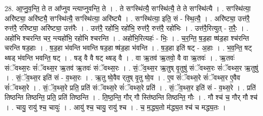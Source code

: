 \documentclass[17pt]{extarticle}
\begin{document}
28. आ॒प्नु॒व॒न्ति॒ ते त आ᳚प्नुव न्त्याप्नुवन्ति॒ ते । . ते सꣳस्थि॑त्यै॒ सꣳस्थि॑त्यै॒ ते ते सꣳस्थि॑त्यै । . सꣳस्थि॑त्या॒ अरि॑ष्ट्या॒ अरि॑ष्ट्यै॒ सꣳस्थि॑त्यै॒ सꣳस्थि॑त्या॒ अरि॑ष्ट्यै । . सꣳस्थि॑त्या॒ इति॒ सं - स्थि॒त्यै॒ । . अरि॑ष्ट्या॒ उत्त॑रै॒ रुत्त॑रै॒ ररि॑ष्ट्या॒ अरि॑ष्ट्या॒ उत्त॑रैः । . उत्त॑रै॒ रहो॑भि॒ रहो॑भि॒ रुत्त॑रै॒ रुत्त॑रै॒ रहो॑भिः । . उत्त॑रै॒रित्युत् - त॒रैः॒ । . अहो॑भि श्चरन्ति चर॒ न्त्यहो॑भि॒ रहो॑भि श्चरन्ति । . अहो॑भि॒रित्यहः॑ - भिः॒ । . च॒र॒न्ति॒ ष॒ड॒हा ष्ष॑ड॒हा श्च॑रन्ति चरन्ति षड॒हाः । . ष॒ड॒हा भ॑वन्ति भवन्ति षड॒हा ष्ष॑ड॒हा भ॑वन्ति । . ष॒ड॒हा इति॑ षट् - अ॒हाः । . भ॒व॒न्ति॒ षट् थ्षड् भ॑वन्ति भवन्ति॒ षट् । . षड् वै वै षट् थ्षड् वै । . वा ऋ॒तव॑ ऋ॒तवो॒ वै वा ऋ॒तवः॑ । . ऋ॒तवः॑ संॅवथ्स॒रः सं॑ॅवथ्स॒र ऋ॒तव॑ ऋ॒तवः॑ संॅवथ्स॒रः । . सं॒ॅव॒थ्स॒र ऋ॒तुष् वृ॒तुषु॑ संॅवथ्स॒रः सं॑ॅवथ्स॒र ऋ॒तुषु॑ । . सं॒ॅव॒थ्स॒र इति॑ सं - व॒थ्स॒रः । . ऋ॒तु ष्वे॒वैव र्‌तुष् वृ॒तु ष्वे॒व । . ए॒व सं॑ॅवथ्स॒रे सं॑ॅवथ्स॒र ए॒वैव सं॑ॅवथ्स॒रे । . सं॒ॅव॒थ्स॒रे प्रति॒ प्रति॑ संॅवथ्स॒रे सं॑ॅवथ्स॒रे प्रति॑ । . सं॒ॅव॒थ्स॒र इति॑ सं - व॒थ्स॒रे । . प्रति॑ तिष्ठन्ति तिष्ठन्ति॒ प्रति॒ प्रति॑ तिष्ठन्ति । . ति॒ष्ठ॒न्ति॒ गौर् गौ स्ति॑ष्ठन्ति तिष्ठन्ति॒ गौः । . गौ श्च॑ च॒ गौर् गौ श्च॑ । . चायु॒ रायु॑ श्च॒ चायुः॑ । . आयु॑ श्च॒ चायु॒ रायु॑ श्च । . च॒ म॒द्ध्य॒तो म॑द्ध्य॒त श्च॑ च मद्ध्य॒तः । \newline
\end{document}
